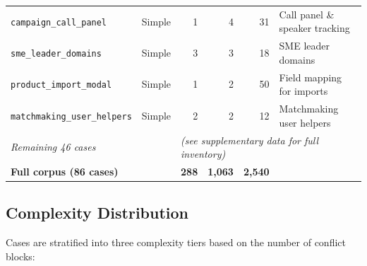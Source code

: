 \documentclass[11pt,letterpaper]{article}
\begin{document}
\begin{table}[H]
\begin{tabular}{llrrrl}
\texttt{campaign\_call\_panel}     & Simple   & 1 &  4 & 31  & Call panel \& speaker tracking \\
\texttt{sme\_leader\_domains}      & Simple   & 3 &  3 & 18  & SME leader domains \\
\texttt{product\_import\_modal}    & Simple   & 1 &  2 & 50  & Field mapping for imports \\
\texttt{matchmaking\_user\_helpers}& Simple   & 2 &  2 & 12  & Matchmaking user helpers \\
\midrule
\multicolumn{2}{l}{\emph{Remaining 46 cases}} & \multicolumn{4}{l}{\emph{(see supplementary data for full inventory)}} \\
\midrule
\textbf{Full corpus (86 cases)} &          & \textbf{288} & \textbf{1{,}063} & \textbf{2{,}540} & \\
\bottomrule
\end{tabular}
\end{table}

\subsection{Complexity Distribution}

Cases are stratified into three complexity tiers based on the number of conflict blocks:
\end{document}
